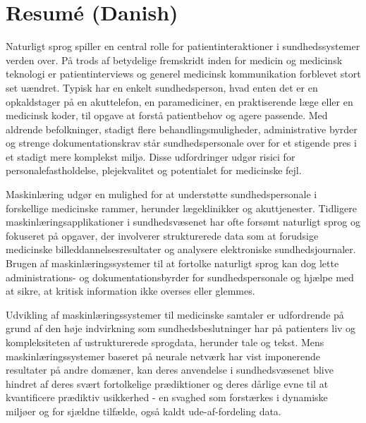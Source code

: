 
\chapter[resumé (danish)]{Resumé (Danish)}

Naturligt sprog spiller en central rolle for patientinteraktioner i sundhedssystemer verden over. 
På trods af betydelige fremskridt inden for medicin og medicinsk teknologi er patientinterviews og generel medicinsk kommunikation forblevet stort set uændret. Typisk har en enkelt sundhedsperson, hvad enten det er en opkaldstager på en akuttelefon, en paramediciner, en praktiserende læge eller en medicinsk koder, til opgave at forstå patientbehov og agere passende. Med aldrende befolkninger, stadigt flere behandlingsmuligheder, administrative byrder og strenge dokumentationskrav står sundhedspersonale over for et stigende pres i et stadigt mere komplekst miljø. Disse udfordringer udgør risici for personalefastholdelse, plejekvalitet og potentialet for medicinske fejl.

Maskinlæring udgør en mulighed for at understøtte sundhedspersonale i forskellige medicinske rammer, herunder lægeklinikker og akuttjenester. Tidligere maskinlæringsapplikationer i sundhedsvæsenet har ofte forsømt naturligt sprog og fokuseret på opgaver, der involverer strukturerede data som at forudsige medicinske billeddannelsesresultater og analysere elektroniske sundhedsjournaler. Brugen af maskinlæringssystemer til at fortolke naturligt sprog kan dog lette administrations- og dokumentationsbyrder for sundhedspersonale og hjælpe med at sikre, at kritisk information ikke overses eller glemmes.

Udvikling af maskinlæringssystemer til medicinske samtaler er udfordrende på grund af den høje indvirkning som sundhedsbeslutninger har på patienters liv og kompleksiteten af ustrukturerede sprogdata, herunder tale og tekst. Mens maskinlæringssystemer baseret på neurale netværk har vist imponerende resultater på andre domæner, kan deres anvendelse i sundhedsvæsenet blive hindret af deres svært fortolkelige prædiktioner og deres dårlige evne til at kvantificere prædiktiv usikkerhed - en svaghed som forstærkes i dynamiske miljøer og for sjældne tilfælde, også kaldt ude-af-fordeling data.

